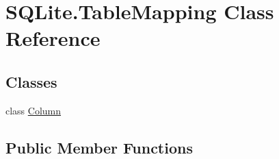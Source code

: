 \hypertarget{classSQLite_1_1TableMapping}{\section{S\-Q\-Lite.\-Table\-Mapping Class Reference}
\label{classSQLite_1_1TableMapping}
}
\subsection*{Classes}
\begin{DoxyCompactItemize}
\item 
class \hyperlink{classSQLite_1_1TableMapping_1_1Column}{Column}
\end{DoxyCompactItemize}
\subsection*{Public Member Functions}
